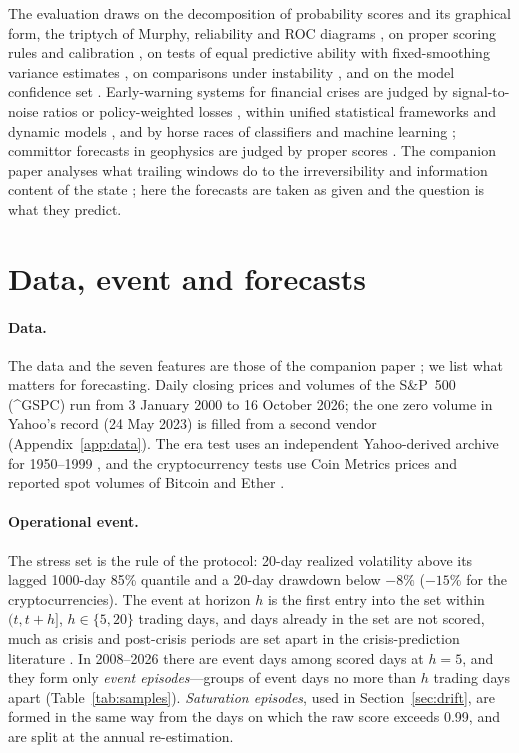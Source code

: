 \documentclass[preprint,12pt,authoryear]{elsarticle}
\begin{document}
The evaluation draws on the decomposition of probability scores \citep{murphy1973,stephenson2008,brocker2009,dimitriadis2021} and its graphical form, the triptych of Murphy, reliability and ROC diagrams \citep{dimitriadis2024}, on proper scoring rules and calibration \citep{gneiting2007scoring,gneiting2007calibration}, on tests of equal predictive ability \citep{diebold1995,harvey1997,giacomini2006,diebold2015} with fixed-smoothing variance estimates \citep{lazarus2018,coroneo2020}, on comparisons under instability \citep{giacomini2010}, and on the model confidence set \citep{hansen2011}. Early-warning systems for financial crises are judged by signal-to-noise ratios or policy-weighted losses \citep{kaminsky1998,alessi2011,drehmann2014}, within unified statistical frameworks \citep{candelon2012} and dynamic models \citep{candelon2014}, and by horse races of classifiers and machine learning \citep{holopainen2017,beutel2019,fouliard2021,bluwstein2023}; committor forecasts in geophysics are judged by proper scores \citep{finkel2021,miloshevich2023}. The companion paper analyses what trailing windows do to the irreversibility and information content of the state \citep{xingpan2026}; here the forecasts are taken as given and the question is what they predict.

\section{Data, event and forecasts}\label{sec:data}
\paragraph{Data.} The data and the seven features are those of the companion paper \citep[Appendix~E]{xingpan2026}; we list what matters for forecasting. Daily closing prices and volumes of the S\&P~500 (\textasciicircum GSPC) run from 3 January 2000 to 16 October 2026; the one zero volume in Yahoo's record (24 May 2023) is filled from a second vendor (Appendix~\ref{app:data}). The era test uses an independent Yahoo-derived archive for 1950--1999 \citep{vijinho}, and the cryptocurrency tests use Coin Metrics prices and reported spot volumes of Bitcoin and Ether \citep{coinmetrics}.

\paragraph{Operational event.} The stress set is the rule of the protocol: 20-day realized volatility above its lagged 1000-day 85\% quantile and a 20-day drawdown below $-8\%$ ($-15\%$ for the cryptocurrencies). The event at horizon $h$ is the first entry into the set within $(t,t+h]$, $h\in\{5,20\}$ trading days, and days already in the set are not scored, much as crisis and post-crisis periods are set apart in the crisis-prediction literature \citep{bussiere2006}. In 2008--2026 there are \nEventsFive event days among \nDaysFive scored days at $h=5$, and they form only \EpisFive \emph{event episodes}---groups of event days no more than $h$ trading days apart (Table~\ref{tab:samples}). \emph{Saturation episodes}, used in Section~\ref{sec:drift}, are formed in the same way from the days on which the raw score exceeds 0.99, and are split at the annual re-estimation.
\end{document}
